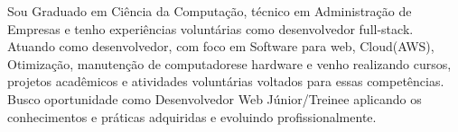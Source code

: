 



\begin{justify}
Sou Graduado em Ciência da Computação, técnico em Administração de Empresas e tenho experiências voluntárias como desenvolvedor 
full-stack. Atuando como desenvolvedor, com foco em Software para web, Cloud(AWS), Otimização,
manutenção de computadorese hardware e venho realizando
cursos, projetos acadêmicos e atividades voluntárias voltados para essas competências. 
Busco oportunidade como Desenvolvedor Web Júnior/Treinee aplicando os conhecimentos
e práticas adquiridas e evoluindo profissionalmente.
\end{justify}


